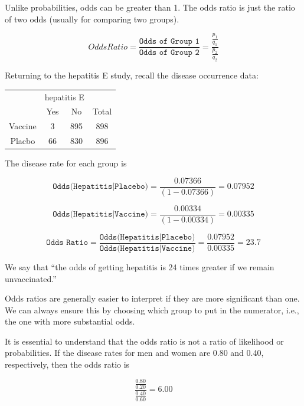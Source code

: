 \documentclass[11pt, chapterprefix=true]{scrbook}\usepackage[]{graphicx}\usepackage[]{color}
\begin{document}
Unlike probabilities, odds can be greater than 1.  The odds ratio is just the ratio of two odds (usually for comparing two groups).

\begin{equation*}
  Odds Ratio = \frac{ \texttt{Odds of Group 1}}{\texttt{Odds of Group 2}} = \frac{ \frac{p_1}{q_1}}{ \frac{p_2}{q_2}}
\end{equation*}

Returning to the hepatitis E study, recall the disease occurrence data:

\begin{table}[ht]
\centering
\begin{tabular}{@{} cccc @{}} \hline
 & \multicolumn{2}{c}{hepatitis E} \\
 & Yes & No & Total \\ \hline
 Vaccine & 3 & 895 & 898 \\
 Placbo  & 66 & 830 & 896 \\ \hline
 \end{tabular}
 \end{table}

The disease rate for each group is

\begin{equation*}
  \texttt{Odds(Hepatitis|Placebo)} = \frac{0.07366}{(1 - 0.07366)} = 0.07952
\end{equation*}

\begin{equation*}
  \texttt{Odds(Hepatitis|Vaccine)} = \frac{0.00334}{(1 - 0.00334)} = 0.00335
\end{equation*}

\begin{equation*}
  \texttt{Odds Ratio} = \frac{\texttt{Odds(Hepatitis|Placebo)}}{\texttt{Odds(Hepatitis|Vaccine)}} = \frac{0.07952}{0.00335} = 23.7
\end{equation*}

We say that ``the odds of getting hepatitis is 24 times greater if we remain unvaccinated.''

Odds ratios are generally easier to interpret if they are more significant than one.  We can always ensure this by choosing which group to put in the numerator, i.e., the one with more substantial odds.

It is essential to understand that the odds ratio is not a ratio of likelihood or probabilities.  If the disease rates for men and women are 0.80 and 0.40, respectively, then the odds ratio is

\begin{equation*}
   \frac{ \frac{0.80}{0.20}}{ \frac{0.40}{0.60}} = 6.00
\end{equation*}
\end{document}
